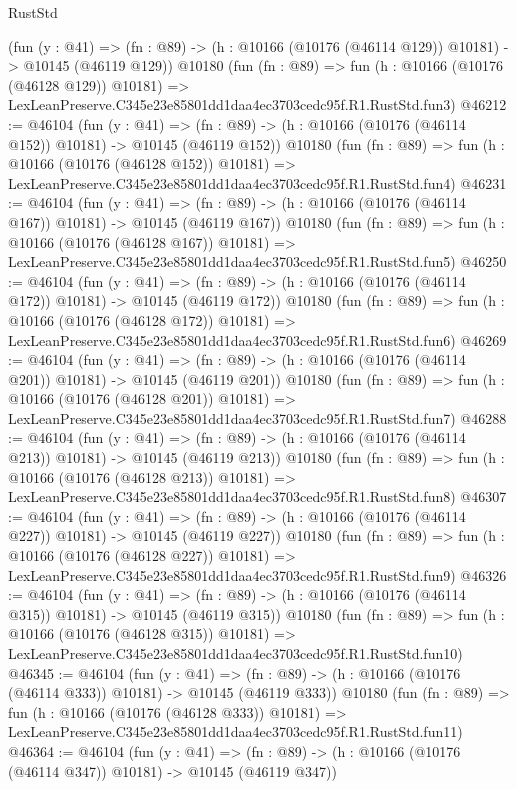 \begin{lexlean}{RustStd}
\begin{coremodule}
    (fun (y : @41) =>
    (fn : @89) -> (h : @10166 (@10176 (@46114 @129)) @10181) -> @10145 (@46119 @129))
    @10180
    (fun (fn : @89) =>
    fun (h : @10166 (@10176 (@46128 @129)) @10181) =>
    LexLeanPreserve.C345e23e85801dd1daa4ec3703cedc95f.R1.RustStd.fun3)
@46212 := @46104
    (fun (y : @41) =>
    (fn : @89) -> (h : @10166 (@10176 (@46114 @152)) @10181) -> @10145 (@46119 @152))
    @10180
    (fun (fn : @89) =>
    fun (h : @10166 (@10176 (@46128 @152)) @10181) =>
    LexLeanPreserve.C345e23e85801dd1daa4ec3703cedc95f.R1.RustStd.fun4)
@46231 := @46104
    (fun (y : @41) =>
    (fn : @89) -> (h : @10166 (@10176 (@46114 @167)) @10181) -> @10145 (@46119 @167))
    @10180
    (fun (fn : @89) =>
    fun (h : @10166 (@10176 (@46128 @167)) @10181) =>
    LexLeanPreserve.C345e23e85801dd1daa4ec3703cedc95f.R1.RustStd.fun5)
@46250 := @46104
    (fun (y : @41) =>
    (fn : @89) -> (h : @10166 (@10176 (@46114 @172)) @10181) -> @10145 (@46119 @172))
    @10180
    (fun (fn : @89) =>
    fun (h : @10166 (@10176 (@46128 @172)) @10181) =>
    LexLeanPreserve.C345e23e85801dd1daa4ec3703cedc95f.R1.RustStd.fun6)
@46269 := @46104
    (fun (y : @41) =>
    (fn : @89) -> (h : @10166 (@10176 (@46114 @201)) @10181) -> @10145 (@46119 @201))
    @10180
    (fun (fn : @89) =>
    fun (h : @10166 (@10176 (@46128 @201)) @10181) =>
    LexLeanPreserve.C345e23e85801dd1daa4ec3703cedc95f.R1.RustStd.fun7)
@46288 := @46104
    (fun (y : @41) =>
    (fn : @89) -> (h : @10166 (@10176 (@46114 @213)) @10181) -> @10145 (@46119 @213))
    @10180
    (fun (fn : @89) =>
    fun (h : @10166 (@10176 (@46128 @213)) @10181) =>
    LexLeanPreserve.C345e23e85801dd1daa4ec3703cedc95f.R1.RustStd.fun8)
@46307 := @46104
    (fun (y : @41) =>
    (fn : @89) -> (h : @10166 (@10176 (@46114 @227)) @10181) -> @10145 (@46119 @227))
    @10180
    (fun (fn : @89) =>
    fun (h : @10166 (@10176 (@46128 @227)) @10181) =>
    LexLeanPreserve.C345e23e85801dd1daa4ec3703cedc95f.R1.RustStd.fun9)
@46326 := @46104
    (fun (y : @41) =>
    (fn : @89) -> (h : @10166 (@10176 (@46114 @315)) @10181) -> @10145 (@46119 @315))
    @10180
    (fun (fn : @89) =>
    fun (h : @10166 (@10176 (@46128 @315)) @10181) =>
    LexLeanPreserve.C345e23e85801dd1daa4ec3703cedc95f.R1.RustStd.fun10)
@46345 := @46104
    (fun (y : @41) =>
    (fn : @89) -> (h : @10166 (@10176 (@46114 @333)) @10181) -> @10145 (@46119 @333))
    @10180
    (fun (fn : @89) =>
    fun (h : @10166 (@10176 (@46128 @333)) @10181) =>
    LexLeanPreserve.C345e23e85801dd1daa4ec3703cedc95f.R1.RustStd.fun11)
@46364 := @46104
    (fun (y : @41) =>
    (fn : @89) -> (h : @10166 (@10176 (@46114 @347)) @10181) -> @10145 (@46119 @347))

\end{coremodule}
\end{lexlean}
